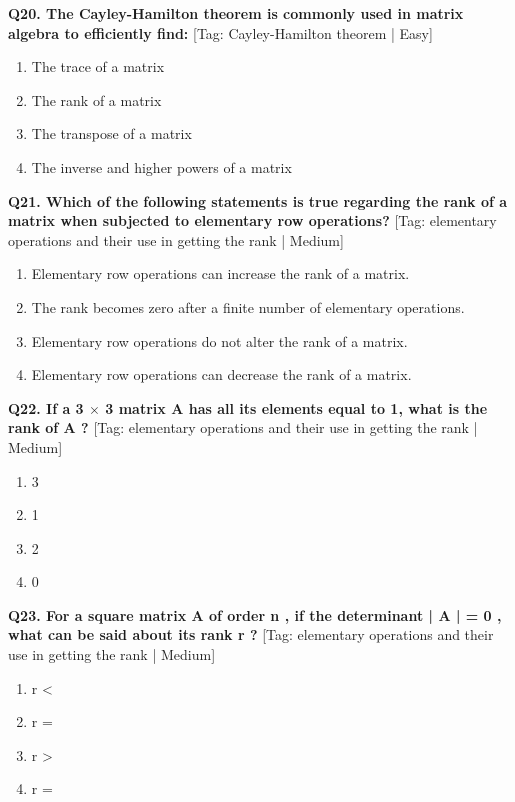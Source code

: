 \noindent\textbf{Q20. The Cayley-Hamilton theorem is commonly used in matrix algebra to efficiently find:} \hfill [Tag: Cayley-Hamilton theorem | Easy]
\begin{enumerate}[label=(\alph*),topsep=2pt,itemsep=1pt,partopsep=0pt,parsep=0pt]
    \item {{The trace of a matrix}}
    \item {{The rank of a matrix}}
    \item {{The transpose of a matrix}}
    \item {{The inverse and higher powers of a matrix}}
\end{enumerate}
\vspace{2mm}

\noindent\textbf{Q21. Which of the following statements is true regarding the rank of a matrix when subjected to elementary row operations?} \hfill [Tag: elementary operations and their use in getting the rank | Medium]
\begin{enumerate}[label=(\alph*),topsep=2pt,itemsep=1pt,partopsep=0pt,parsep=0pt]
    \item {{Elementary row operations can increase the rank of a matrix.}}
    \item {{The rank becomes zero after a finite number of elementary operations.}}
    \item {{Elementary row operations do not alter the rank of a matrix.}}
    \item {{Elementary row operations can decrease the rank of a matrix.}}
\end{enumerate}
\vspace{2mm}

\noindent\textbf{Q22. If a 3 $\times$ 3 matrix A has all its elements equal to 1, what is the rank of A ?} \hfill [Tag: elementary operations and their use in getting the rank | Medium]
\begin{enumerate}[label=(\alph*),topsep=2pt,itemsep=1pt,partopsep=0pt,parsep=0pt]
    \item {{3}}
    \item {{1}}
    \item {{2}}
    \item {{0}}
\end{enumerate}
\vspace{2mm}

\noindent\textbf{Q23. For a square matrix A of order n , if the determinant | A | = 0 , what can be said about its rank r ?} \hfill [Tag: elementary operations and their use in getting the rank | Medium]
\begin{enumerate}[label=(\alph*),topsep=2pt,itemsep=1pt,partopsep=0pt,parsep=0pt]
    \item {{r <}}
    \item {{r =}}
    \item {{r >}}
    \item {{r =}}
\end{enumerate}
\vspace{2mm}

